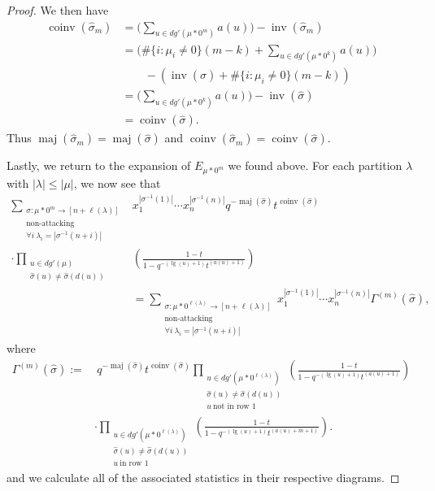 \documentclass[11pt]{article}
\theoremstyle{definition}
\numberwithin{equation}{section}
\DeclareMathOperator{\maj}{maj}
\DeclareMathOperator{\inv}{inv}
\DeclareMathOperator{\coinv}{coinv}
\DeclareMathOperator{\mathleg}{lg}
\begin{document}
\begin{proof}
We then have 
\begin{align*}
    \coinv(\widehat{\sigma}_m)&= \bigg( \sum_{u \in dg'(\mu * 0^m)} a(u) \bigg) - \inv(\widehat{\sigma}_m) \\
    &= \bigg(\#\{i:\mu_i \neq 0\}(m-k) + \sum_{u \in dg'(\mu*0^k)} a(u)\bigg) \\ & \qquad - \left( \inv(\widehat{\sigma}) + \#\{i:\mu_i \neq 0\}(m-k)\right)\\
    & = \bigg( \sum_{u \in dg'(\mu*0^k)} a(u)\bigg) - \inv(\widehat{\sigma}) \\
    &= \coinv(\widehat{\sigma}).
\end{align*}
  Thus $\maj(\widehat{\sigma}_m) = \maj(\widehat{\sigma})$ and $\coinv(\widehat{\sigma}_m)= \coinv(\widehat{\sigma}).$

Lastly, we return to the expansion of $E_{\mu*0^m}$ we found above. For each partition $\lambda$ with $|\lambda| \leq |\mu|$, we now see that 
\begin{align*}
     \sum_{\substack{\sigma:\mu* 0^m \rightarrow [n+\ell(\lambda)]\\ \text{non-attacking} \\ \forall i ~ \lambda_i = |\sigma^{-1}(n+i)|}} & x_1 ^{|\sigma^{-1}(1)|}\cdots x_n ^{|\sigma^{-1}(n)|} q^{-\maj(\widehat{\sigma})}t^{\coinv(\widehat{\sigma})} \\
      \cdot \prod_{\substack{u \in dg'(\mu) \\ \widehat{\sigma}(u) \neq \widehat{\sigma}(d(u))}} & \left( \frac{1-t}{1-q^{-(\mathleg(u)+1)}t^{(a(u)+1)}} \right) \\
     & = \sum_{\substack{\sigma:\mu* 0^{\ell(\lambda)} \rightarrow [n+\ell(\lambda)]\\ \text{non-attacking} \\ \forall i ~ \lambda_i = |\sigma^{-1}(n+i)|}} x_1 ^{|\sigma^{-1}(1)|}\cdots x_n ^{|\sigma^{-1}(n)|} \Gamma^{(m)}(\widehat{\sigma}),
\end{align*}
where
\begin{align*}
    \Gamma^{(m)}(\widehat{\sigma}) := &\ {} q^{-\maj(\widehat{\sigma})}t^{\coinv(\widehat{\sigma})} \prod_{\substack{ u \in dg'(\mu * 0^{\ell(\lambda)}) \\ \widehat{\sigma}(u) \neq \widehat{\sigma}(d(u)) \\ u ~ \text{not in row } 1 }} \left( \frac{1-t}{1-q^{-(\mathleg(u)+1)}t^{(a(u)+1)}} \right) \\
    & \cdot {} \prod_{\substack{ u \in dg'(\mu * 0^{\ell(\lambda)}) \\ \widehat{\sigma}(u) \neq \widehat{\sigma}(d(u)) \\ u ~ \text{in row } 1 }} \left( \frac{1-t}{1-q^{-(\mathleg(u) +1)}t^{(a(u) + m + 1)}} \right).
\end{align*}
and we calculate all of the associated statistics in their respective diagrams.
 \end{proof}
\end{document}
